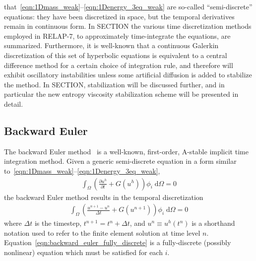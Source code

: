 that~\eqref{eqn:1Dmass_weak}--\eqref{eqn:1Denergy_3eq_weak} are
so-called ``semi-discrete'' equations: they have been discretized in
space, but the temporal derivatives remain in continuous form.  In
SECTION the various time discretization methods
employed in RELAP-7, to approximately time-integrate the equations,
are summarized.  Furthermore, it is well-known
that a continuous Galerkin discretization of this set of hyperbolic
equations is equivalent to a central difference method for a certain
choice of integration rule, and therefore will exhibit oscillatory
instabilities unless some artificial diffusion is added to stabilize
the method.  In SECTION, stabilization will be
discussed further, and in particular the new entropy viscosity 
stabilization scheme will be presented in detail.
%
\subsection{Backward Euler\label{sec:backward_euler}}
%
The backward Euler method~\cite{Butcher_2003} is a well-known, first-order, A-stable
implicit time integration method.  Given a generic
semi-discrete equation in a form similar to~\eqref{eqn:1Dmass_weak}--\eqref{eqn:1Denergy_3eq_weak},
\begin{align}
  \int_{\Omega} \left(\frac{\partial u^h}{\partial t} + G(u^h) \right) \phi_i \; \text{d}{\Omega} = 0
\end{align}
the backward Euler method results in the temporal discretization
\begin{align}
  \label{eqn:backward_euler_fully_discrete}
  \int_{\Omega} \left( \frac{u^{n+1} - u^n}{\Delta t} + G(u^{n+1}) \right) \phi_i \; \text{d}{\Omega} = 0
\end{align}
where $\Delta t$ is the timestep, $t^{n+1} = t^n + \Delta t$, and $u^n
\equiv u^h(t^n)$ is a shorthand notation used to refer to the finite
element solution at time level
$n$. Equation~\eqref{eqn:backward_euler_fully_discrete} is a
fully-discrete (possibly nonlinear) equation which must be satisfied
for each $i$.

